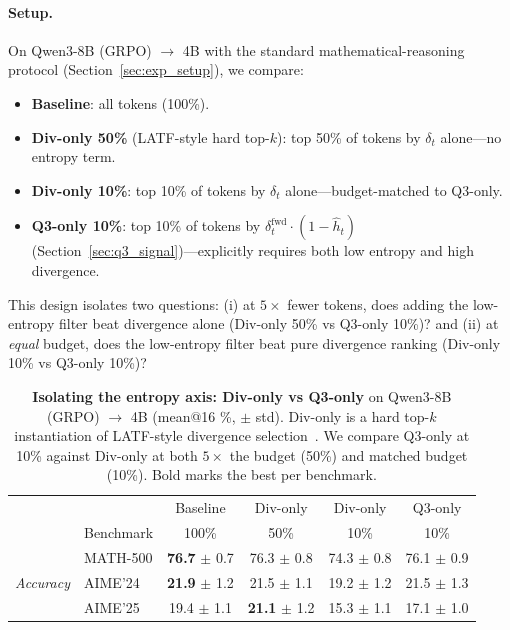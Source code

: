 \documentclass{article}
\begin{document}
\paragraph{Setup.}
On Qwen3-8B (GRPO) $\to$ 4B with the standard mathematical-reasoning protocol (Section~\ref{sec:exp_setup}), we compare:
\begin{itemize}
    \item \textbf{Baseline}: all tokens (100\%).
    \item \textbf{Div-only 50\%} (LATF-style hard top-$k$): top 50\% of tokens by $\delta_t$ alone---no entropy term.
    \item \textbf{Div-only 10\%}: top 10\% of tokens by $\delta_t$ alone---budget-matched to Q3-only.
    \item \textbf{Q3-only 10\%}: top 10\% of tokens by $\delta_t^{\mathrm{fwd}} \cdot (1 - \hat{h}_t)$ (Section~\ref{sec:q3_signal})---explicitly requires both low entropy and high divergence.
\end{itemize}
This design isolates two questions: (i) at $5\times$ fewer tokens, does adding the low-entropy filter beat divergence alone (Div-only 50\% vs Q3-only 10\%)? and (ii) at \emph{equal} budget, does the low-entropy filter beat pure divergence ranking (Div-only 10\% vs Q3-only 10\%)?

\begin{table}[H]
\centering
\caption{\textbf{Isolating the entropy axis: Div-only vs Q3-only} on Qwen3-8B (GRPO) $\to$ 4B (mean@16 \%, $\pm$ std). Div-only is a hard top-$k$ instantiation of LATF-style divergence selection~\citep{xie2026adakd}. We compare Q3-only at 10\% against Div-only at both $5\times$ the budget (50\%) and matched budget (10\%). Bold marks the best per benchmark.}
\label{tab:div_only}
\small
\begin{tabular}{l l cccc}
\toprule
 & & Baseline & Div-only & Div-only & Q3-only \\
 & Benchmark & 100\% & 50\% & 10\% & 10\% \\
\midrule
\multirow{3}{*}{\emph{Accuracy}}
 & MATH-500 & \textbf{76.7} $\pm$ 0.7 & 76.3 $\pm$ 0.8 & 74.3 $\pm$ 0.8 & 76.1 $\pm$ 0.9 \\
 & AIME'24  & \textbf{21.9} $\pm$ 1.2 &  21.5 $\pm$ 1.1 &  19.2 $\pm$ 1.2 & 21.5 $\pm$ 1.3 \\
 & AIME'25  & 19.4 $\pm$ 1.1 & \textbf{21.1} $\pm$ 1.2 & 15.3 $\pm$ 1.1 & 17.1 $\pm$ 1.0 \\
\bottomrule
\end{tabular}
\end{table}
\end{document}
